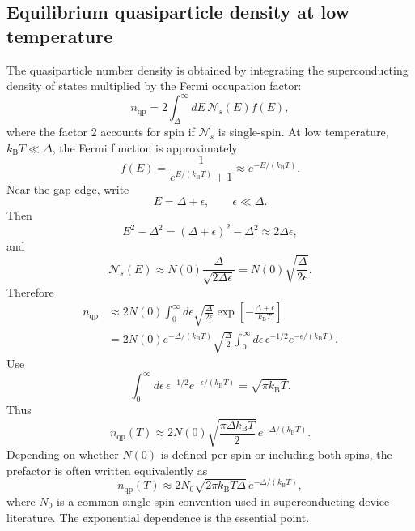 \documentclass[11pt]{article}
\numberwithin{equation}{section}
\newcommand{\kB}{k_{\mathrm{B}}}
\newcommand{\Nzero}{N(0)}
\newcommand{\DOS}{\mathcal{N}}
\begin{document}
\subsection{Equilibrium quasiparticle density at low temperature}

The quasiparticle number density is obtained by integrating the superconducting density of states multiplied by the Fermi occupation factor:
\begin{equation}
n_{\mathrm{qp}}=2\int_{\Delta}^{\infty} dE\,\DOS_s(E)f(E),
\end{equation}
where the factor 2 accounts for spin if $\DOS_s$ is single-spin. At low temperature, $\kB T\ll \Delta$, the Fermi function is approximately
\begin{equation}
f(E)=\frac{1}{e^{E/(\kB T)}+1}\approx e^{-E/(\kB T)}.
\end{equation}
Near the gap edge, write
\begin{equation}
E=\Delta+\epsilon,
\qquad
\epsilon\ll\Delta.
\end{equation}
Then
\begin{equation}
E^2-\Delta^2=(\Delta+\epsilon)^2-\Delta^2\approx 2\Delta\epsilon,
\end{equation}
and
\begin{equation}
\DOS_s(E)\approx \Nzero\frac{\Delta}{\sqrt{2\Delta\epsilon}}=\Nzero\sqrt{\frac{\Delta}{2\epsilon}}.
\end{equation}
Therefore
\begin{align}
n_{\mathrm{qp}}&\approx 2\Nzero\int_0^{\infty}d\epsilon\sqrt{\frac{\Delta}{2\epsilon}}\exp\left[-\frac{\Delta+\epsilon}{\kB T}\right]\\
&=2\Nzero e^{-\Delta/(\kB T)}\sqrt{\frac{\Delta}{2}}
\int_0^{\infty}d\epsilon\,\epsilon^{-1/2}e^{-\epsilon/(\kB T)}.
\end{align}
Use
\begin{equation}
\int_0^{\infty}d\epsilon\,\epsilon^{-1/2}e^{-\epsilon/(\kB T)}=\sqrt{\pi\kB T}.
\end{equation}
Thus
\begin{equation}
\boxed{n_{\mathrm{qp}}(T)\approx 2\Nzero\sqrt{\frac{\pi\Delta\kB T}{2}}\,e^{-\Delta/(\kB T)}.}
\end{equation}
Depending on whether $\Nzero$ is defined per spin or including both spins, the prefactor is often written equivalently as
\begin{equation}
\boxed{n_{\mathrm{qp}}(T)\approx 2N_0\sqrt{2\pi \kB T\Delta}\,e^{-\Delta/(\kB T)},}
\end{equation}
where $N_0$ is a common single-spin convention used in superconducting-device literature. The exponential dependence is the essential point.
\end{document}
